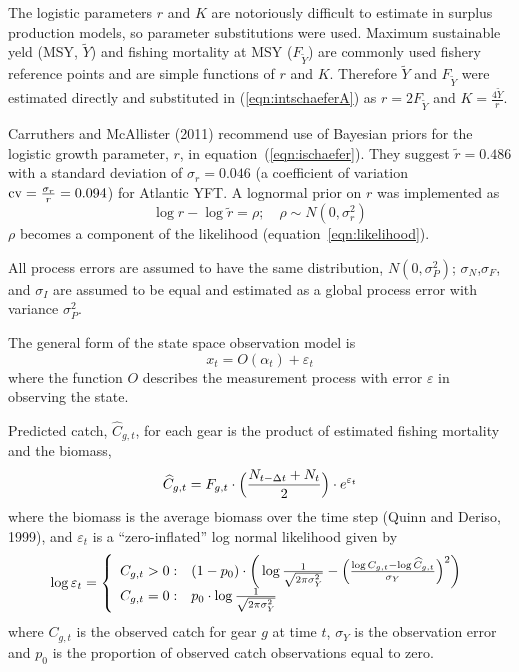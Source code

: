 \documentclass[12pt,letterpaper]{article}
\newcommand\MSY{\widetilde{Y}}
\newcommand\Fmsy{F_{\MSY}}
\begin{document}
The logistic parameters $r$ and $K$ are notoriously difficult to estimate
in surplus production models, 
so parameter substitutions were used. 
Maximum sustainable yeld
(MSY, $\MSY$) and fishing mortality at MSY ($\Fmsy$) are commonly used
fishery reference points and are simple functions of $r$ and $K$.
Therefore $\MSY$ and $\Fmsy$ were
estimated directly and substituted in (\ref{eqn:intschaeferA}) as
$r=2\Fmsy$ and $K=\frac{4\MSY}{r}$.

Carruthers and McAllister (2011) recommend use of Bayesian priors for the
logistic growth parameter, $r$, in equation~(\ref{eqn:ischaefer}). They
suggest $\tilde{r} = 0.486$ with a standard deviation of $\sigma_r = 0.046$
(a coefficient of variation ${\rm cv}=\frac{\sigma_r}{r}=0.094$)
for Atlantic YFT.
A lognormal prior on $r$ was implemented as 
\begin{equation}
\log r - \log \tilde{r} = \rho ;\quad \rho\sim N(0,\sigma^2_r)
\end{equation}
$\rho$ becomes a component of the likelihood
(equation~\ref{eqn:likelihood}).

All process errors are assumed to have the same distribution,
$N(0,\sigma^2_P)$; $\sigma_N$,$\sigma_F$, and $\sigma_I$ are assumed
to be equal and estimated as a global process error with variance
$\sigma^2_P$.

The general form of the state space observation model is
\begin{equation}
x_t = O(\alpha_t) + \varepsilon_t
\end{equation}
where the function $O$ describes the measurement process with
error $\varepsilon$ in observing the state.

Predicted catch, $\widehat{C}_{g,t}$, for each gear is the product of
estimated fishing mortality and the biomass,
\begin{equation}
\widehat{C}_{g,t} = F_{g,t}\cdot\Bigl(\frac{N_{t-\Delta
t}+N_t}{2}\Bigr) \cdot e^{\varepsilon_t}
\label{eqn:obs1}
\end{equation}
where the biomass is  the average
biomass over the time step (Quinn and Deriso, 1999), and
$\varepsilon_t$ is a ``zero-inflated'' log normal likelihood given by
\begin{equation}
  \log \varepsilon_t = \left\{
    \begin{array}{r@{\;:\quad}l}
       C_{g,t} > 0 &
(1-p_0)\cdot\bigg(\log\frac{1}{\sqrt{2\pi\sigma^2_Y}}
          -\Bigl(\frac{\log
C_{g,t}-\log\widehat{C}_{g,t}}{\sigma_Y}\Bigr)^2\bigg)\\
       C_{g,t} = 0 & p_0 \cdot\log \frac{1}{\sqrt{2\pi\sigma^2_Y}}\\
    \end{array}
  \right.
\end{equation}
where $C_{g,t}$ is the observed catch for gear $g$ at time $t$,
$\sigma_Y$ is the observation error and
$p_0$ is the proportion of observed catch observations equal to zero.
\end{document}
